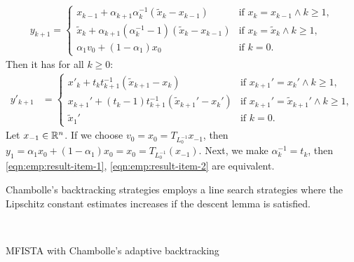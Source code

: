 \documentclass[12pt]{report}
\begin{document}
\begin{example}
\begin{align}
                y_{k + 1} = \begin{cases}
                    x_{k - 1} + \alpha_{k + 1}\alpha_k^{-1}(\tilde x_k - x_{k - 1})
                    & \text{if } x_k = x_{k - 1} \wedge k \ge 1,
                    \\
                    \tilde x_k + \alpha_{k + 1}(\alpha_k^{-1} - 1)(\tilde x_k - x_{k - 1})
                    & \text{if } x_k = \tilde x_k \wedge k \ge 1,
                    \\
                    \alpha_1v_0 + (1 - \alpha_1)x_0 & \text{if } k = 0. 
                \end{cases}
            \end{align}
            Then it has for all $k \ge 0$: 
            \begin{align}\label{eqn:emp:result-item-2}
                y'_{k + 1} &= 
                \begin{cases}
                    x'_k + t_kt_{k + 1}^{-1}(\tilde x_{k + 1} - x_k) 
                    & \text{if } x_{k + 1}' = x_k' \wedge k \ge 1,
                    \\
                    x_{k + 1}' + (t_k - 1)t_{k + 1}^{-1}(\tilde x_{k + 1}' - x_k')  
                    & \text{if } x_{k + 1}' = \tilde x_{k + 1}'\wedge k \ge 1, 
                    \\
                    \tilde x_1'
                    & 
                    \text{if } k = 0. 
                \end{cases}
            \end{align}
            Let $x_{-1} \in \mathbb R^n$. 
            If we choose $v_0 = x_0 = T_{L_0^{-1}} x_{-1}$, then $y_1 = \alpha_1 x_0 + (1 - \alpha_1)x_0 = x_0 = T_{L_0^{-1}}(x_{-1})$.
            Next, we make $\alpha_k^{-1} = t_k$, then \eqref{eqn:emp:result-item-1}, \eqref{eqn:emp:result-item-2} are equivalent. 
        \end{example}
        Chambolle's backtracking strategies employs a line search strategies where the Lipschitz constant estimates increases if the descent lemma is satisfied. 
        \begin{example}\;\\\vspace{-1em}
            \begin{algorithm}[H]\label{alg:mfista-chambolle-ada}
                \begin{algorithmic}[1]
                \end{algorithmic}
                \caption{MFISTA with Chambolle's adaptive backtracking}
            \end{algorithm}
        \end{example}
\end{document}
